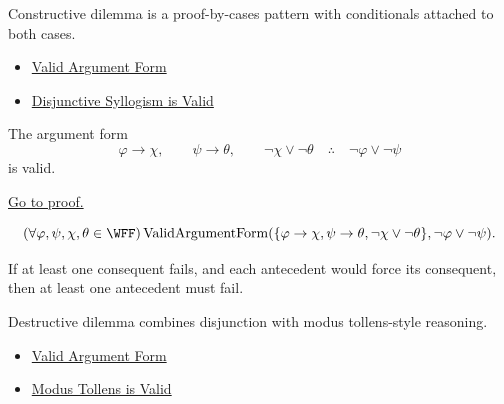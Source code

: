 \begin{remark*}[Interpretation]
Constructive dilemma is a proof-by-cases pattern with conditionals attached to
both cases.
\end{remark*}

\begin{dependencies}
\begin{itemize}
  \item \hyperref[def:valid-argument-form-propositional-logic]{Valid Argument Form}
  \item \hyperref[thm:disjunctive-syllogism-validity-propositional-logic]{Disjunctive Syllogism is Valid}
\end{itemize}
\end{dependencies}

\begin{tcolorbox}[colback=thmbox, colframe=thmborder, arc=2pt,
  left=6pt, right=6pt, top=4pt, bottom=4pt,
  title={\small\textbf{Theorem (Destructive Dilemma is Valid)}},
  fonttitle=\small\bfseries]
\begin{theorem}
\label{thm:destructive-dilemma-validity-propositional-logic}
The argument form
\[
\varphi\to\chi,\qquad \psi\to\theta,\qquad \neg\chi\lor\neg\theta
\quad\therefore\quad
\neg\varphi\lor\neg\psi
\]
is valid.

\noindent\hyperref[prf:destructive-dilemma-validity-propositional-logic]{Go to proof.}
\end{theorem}
\end{tcolorbox}

\begin{remark*}
\[
(\forall\varphi,\psi,\chi,\theta\in\WFF)
\operatorname{ValidArgumentForm}(\{\varphi\to\chi,\psi\to\theta,\neg\chi\lor\neg\theta\},\neg\varphi\lor\neg\psi).
\]
\end{remark*}

\begin{remark*}
If at least one consequent fails, and each antecedent would force its
consequent, then at least one antecedent must fail.
\end{remark*}

\begin{remark*}[Interpretation]
Destructive dilemma combines disjunction with modus tollens-style reasoning.
\end{remark*}

\begin{dependencies}
\begin{itemize}
  \item \hyperref[def:valid-argument-form-propositional-logic]{Valid Argument Form}
  \item \hyperref[thm:modus-tollens-validity-propositional-logic]{Modus Tollens is Valid}
\end{itemize}
\end{dependencies}
